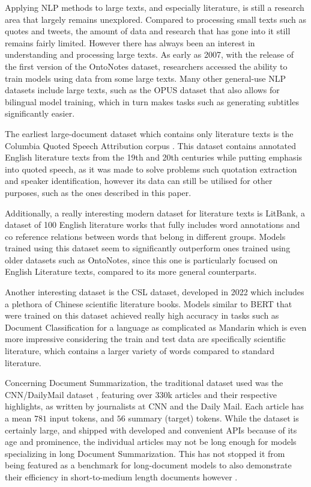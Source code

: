 \documentclass[preprint,review,12pt]{elsarticle}
\begin{document}
Applying NLP methods to large texts, and especially literature, is still a research area that largely remains unexplored. Compared to processing small texts such as quotes and tweets, the amount of data and research that has gone into it still remains fairly limited. However there has always been an interest in understanding and processing large texts. As early as 2007, with the release of the first version of the OntoNotes dataset\cite{ontonotes}, researchers accessed the ability to train models using data from some large texts. Many other general-use NLP datasets include large texts, such as the OPUS dataset that also allows for bilingual model training\cite{tiedemann}, which in turn makes tasks such as generating subtitles significantly easier.  

The earliest large-document dataset which contains only literature texts is the Columbia Quoted Speech Attribution corpus \cite{elson}. This dataset contains annotated English literature texts from the 19th and 20th centuries while putting emphasis into quoted speech, as it was made to solve problems such quotation extraction and speaker identification, however its data can still be utilised for other purposes, such as the ones described in this paper. 

Additionally, a really interesting modern dataset for literature texts is LitBank\cite{bamman}, a dataset of 100 English literature works that fully includes word annotations and co reference relations between words that belong in different groups. Models trained using this dataset seem to significantly outperform ones trained using older datasets such as OntoNotes, since this one is particularly focused on English Literature texts, compared to its more general counterparts.  

Another interesting dataset is the CSL\cite{li} dataset, developed in 2022 which includes a plethora of Chinese scientific literature books. Models similar to BERT that were trained on this dataset achieved really high accuracy in tasks such as Document Classification for a language as complicated as Mandarin which is even more impressive considering the train and test data are specifically scientific literature, which contains a larger variety of words compared to standard literature. 

Concerning Document Summarization, the traditional dataset used was the CNN/DailyMail dataset \cite{nallapati2}, featuring over 330k articles and their respective highlights, as written by journalists at CNN and the Daily Mail. Each article has a mean $781$ input tokens, and $56$ summary (target) tokens. While the dataset is certainly large, and shipped with developed and convenient APIs \cite{tf_cnn_dailymail, kaggle_cnn_dailymail, hugging_face_cnn_dailymail} because of its age and prominence, the individual articles may not be long enough for models specializing in long Document Summarization. This has not stopped it from being featured as a benchmark for long-document models to also demonstrate their efficiency in short-to-medium length documents however\cite{big_bird} .
\end{document}
